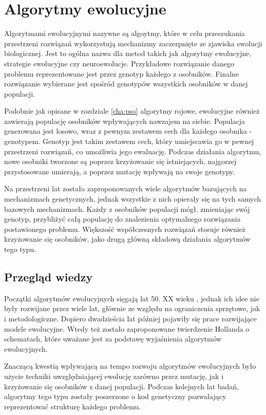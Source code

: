 \chapter{Algorytmy ewolucyjne}
\label{cha:genetyczne}

Algorytmami ewolucyjnymi nazywne są algoytmy, które w celu przeszukania przestrzeni rozwiązań  wykorzystują mechanizmy zaczerpnięte ze zjawiska ewolucji biologicznej. Jest to ogólna nazwa dla metod takich jak algorytmy ewolucyjne, strategie ewolucyjne czy neuroewolucje. Przykładowe rozwiązanie danego problemu reprezentowane jest przez genotyp każdego z osobników. Finalne rozwiązanie wybierane jest spośród genotypów wszystkich osobników w danej populacji.

Podobnie jak opisane w rozdziale \ref{cha:pso} algorytmy rojowe, ewolucyjne również zawierają populację osobników wpływających nawzajem na siebie. Populacja generowana jest losowo, wraz z pewnym zestawem cech dla każdego osobnika - genotypem. Genotyp jest takim zestawem cech, który umiejscawia go w pewnej przestrzeni rozwiązań, co umożliwia jego ewaluację. Podczas działania algorytmu, nowe osobniki tworzone są poprzez krzyżowanie się istniejących, najgorzej przystosowane umierają, a poprzez mutację wpływają na swoje genotypy.  

Na przestrzeni lat zostało zaproponowanych wiele algorytmów bazujących na mechanizmach genetycznych, jednak wszystkie z nich opierały się na tych samych bazowych mechanizmach. Każdy z osobników populacji mógł, zmieniając swój genotyp, przybliżyć całą populację do znalezienia optymalnego rozwiązania postawionego problemu. Większość współczesnych rozwiązań stosuje również krzyżowanie się osobników, jako drugą główną składową działania algorytmów tego typu.

\section{Przegląd wiedzy}
\label{sec:historiagenetycznych}
Początki algorytmów ewolucyjnych sięgają lat 50. XX wieku \cite{GA1}, jednak ich idee nie były rozwijane przez wiele lat, głównie ze względu na ograniczenia sprzętowe, jak i metodologiczne. Dopiero dwadzieścia lat później \cite{GA2} pojawiły się prace rozwijające modele ewolucyjne. Wtedy też zostało zaproponowane twierdzenie Hollanda o schematach, które uważane jest za podstawę wyjaśnienia algorytmów ewolucyjnych. 

Znaczącą kwestią wpływającą na tempo rozwoju algorytmów ewolucyjnych było użycie techniki uwzględniającej ewolucję zarówno przez mutację, jak i krzyżowanie się osobników z danej populacji. Podczas kolejnych lat badań, algorytmy tego typu zostały poszerzone o kod genetyczny pozwalający reprezentować strukturę każdego problemu.

